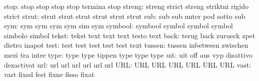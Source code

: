                      stop: stop                      stop
                           stop                      stop
                           termina                   stop
                   streng: streng                    strict
                           streng                    striktni
                           rigido                    strict
                    strut: strut                     strut
                           strut                     strut
                           strut                     strut
                      sub: sub                       sub
                           unter                     pod
                           sotto                     sub
                      sym: sym                       sym
                           sym                       sym
                           sim                       sym
                  symbool: symbool                   symbol
                           symbol                    symbol
                           simbolo                   simbol
                    tekst: tekst                     text
                           text                      text
                           testo                     text
                     back: terug                     back
                           zurueck                   zpet
                           dietro                    inapot
                     test: test                      test
                           test                      test
                           test                      text
                   tussen: tussen                    inbetween
                           zwischen                  mezi
                           tra                       intre
                     type: type                      type
                           tippen                    type
                           type                      type %
                      uit: uit                       off
                           aus                       vyp
                           disattivo                 dezactivat
                      url: url                       url
                           url                       url
                           url                       url
                      URL: URL                       URL
                           URL                       URL
                           URL                       URL
                     vast: vast                      fixed
                           fest                      fixne
                           fisso                     fixat
